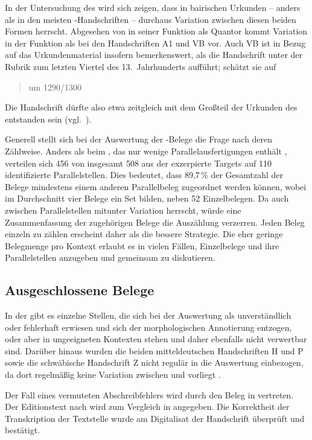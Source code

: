 In der Untersuchung des \CAO{} wird sich zeigen, dass in
bairischen Urkunden -- anders als in den meisten
\KC{}-Handschriften -- durchaus Variation zwischen diesen beiden Formen
herrscht. Abgesehen von  in seiner Funktion als Quantor kommt
Variation in der Funktion als  bei den Handschriften A1 und VB
vor. Auch VB ist in Bezug auf das Urkundenmaterial insofern bemerkenswert, als
\citet[224]{schneider1987} die Handschrift unter der Rubrik zum letzten Viertel
des 13.~Jahrhunderts aufführt; \citet[65]{wolf:kckat} schätzt sie auf
\blockquote{um 1290/1300}. Die Handschrift dürfte also etwa
zeitgleich mit dem Großteil der Urkunden des \CAO{} entstanden sein
(vgl.~).

Generell stellt sich bei der Auswertung der \KC{}-Belege die Frage nach deren
Zählweise. Anders als beim \CAO{}, das nur wenige Parallelausfertigungen
enthält \autocite[vgl.][326--328]{ganslmayeretal2003}, verteilen sich 456 von
insgesamt 508 aus der \KC{} exzerpierte Targets auf 110 identifizierte
Parallelstellen. Dies bedeutet, dass 89,7\,\% der Gesamtzahl der Belege
mindestens einem anderen Parallelbeleg zugeordnet werden können, wobei im
Durchschnitt vier Belege ein Set bilden, neben 52 Einzelbelegen. Da auch
zwischen Parallelstellen mitunter Variation herrscht, würde eine
Zusammenfassung der zugehörigen Belege die Auszählung verzerren. Jeden Beleg
einzeln zu zählen erscheint daher als die bessere Strategie. Die eher geringe
Belegmenge pro Kontext erlaubt es in vielen Fällen, Einzelbelege und ihre
Parallelstellen anzugeben und gemeinsam zu diskutieren.

\subsection{Ausgeschlossene Belege}
\label{subsec:ausgeschlossene_kc}

In der \KC{} gibt es einzelne Stellen, die sich bei der Auswertung als
unverständlich oder fehlerhaft erwiesen und sich der morphologischen
Annotierung entzogen, oder aber in ungeeigneten Kontexten stehen und daher
ebenfalls nicht verwertbar sind. Darüber hinaus wurden die beiden
mitteldeutschen Handschriften H und P sowie die
schwäbische Handschrift Z nicht regulär in die Auswertung
einbezogen, da dort regelmäßig keine Variation zwischen  und
 vorliegt \autocite[vgl. auch][183]{ksw2}.

Der Fall eines vermuteten Abschreibfehlers wird durch den Beleg in
 vertreten. Der Editionstext nach \citet{schroeder1895}
wird zum Vergleich in  angegeben. Die Korrektheit der
Transkription der Textstelle wurde am Digitalisat der
Handschrift überprüft und bestätigt.

